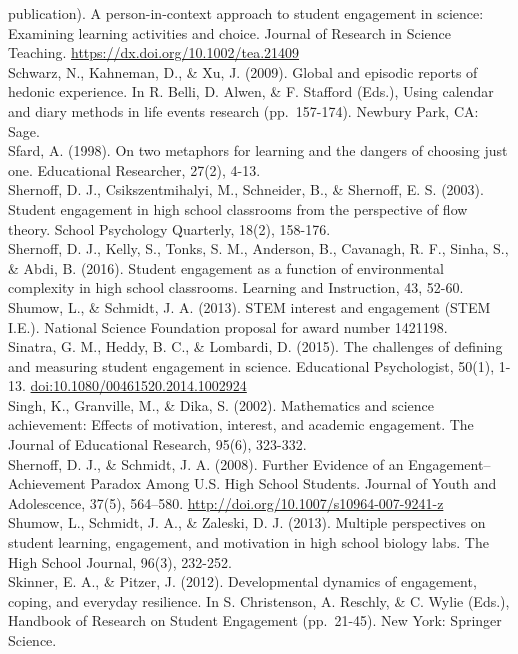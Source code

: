 \documentclass[]{msu-thesis}
\theoremstyle{definition}
\theoremstyle{definition}
\theoremstyle{definition}
\theoremstyle{remark}
\begin{document}
publication). A person-in-context approach to student engagement in
science: Examining learning activities and choice. Journal of Research
in Science Teaching. \url{https://dx.doi.org/10.1002/tea.21409}\\
Schwarz, N., Kahneman, D., \& Xu, J. (2009). Global and episodic reports
of hedonic experience. In R. Belli, D. Alwen, \& F. Stafford (Eds.),
Using calendar and diary methods in life events research (pp.~157-174).
Newbury Park, CA: Sage.\\
Sfard, A. (1998). On two metaphors for learning and the dangers of
choosing just one. Educational Researcher, 27(2), 4-13.\\
Shernoff, D. J., Csikszentmihalyi, M., Schneider, B., \& Shernoff, E. S.
(2003). Student engagement in high school classrooms from the
perspective of flow theory. School Psychology Quarterly, 18(2),
158-176.\\
Shernoff, D. J., Kelly, S., Tonks, S. M., Anderson, B., Cavanagh, R. F.,
Sinha, S., \& Abdi, B. (2016). Student engagement as a function of
environmental complexity in high school classrooms. Learning and
Instruction, 43, 52-60.\\
Shumow, L., \& Schmidt, J. A. (2013). STEM interest and engagement (STEM
I.E.). National Science Foundation proposal for award number 1421198.\\
Sinatra, G. M., Heddy, B. C., \& Lombardi, D. (2015). The challenges of
defining and measuring student engagement in science. Educational
Psychologist, 50(1), 1-13. \url{doi:10.1080/00461520.2014.1002924}\\
Singh, K., Granville, M., \& Dika, S. (2002). Mathematics and science
achievement: Effects of motivation, interest, and academic engagement.
The Journal of Educational Research, 95(6), 323-332.\\
Shernoff, D. J., \& Schmidt, J. A. (2008). Further Evidence of an
Engagement--Achievement Paradox Among U.S. High School Students. Journal
of Youth and Adolescence, 37(5), 564--580.
\url{http://doi.org/10.1007/s10964-007-9241-z}\\
Shumow, L., Schmidt, J. A., \& Zaleski, D. J. (2013). Multiple
perspectives on student learning, engagement, and motivation in high
school biology labs. The High School Journal, 96(3), 232-252.\\
Skinner, E. A., \& Pitzer, J. (2012). Developmental dynamics of
engagement, coping, and everyday resilience. In S. Christenson, A.
Reschly, \& C. Wylie (Eds.), Handbook of Research on Student Engagement
(pp.~21-45). New York: Springer Science.\\
\end{document}
